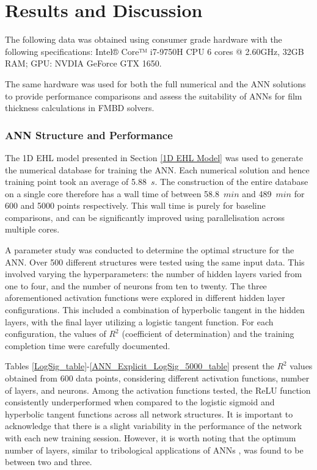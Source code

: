 \section{Results and Discussion}

The following data was obtained using consumer grade hardware with the following specifications: 
Intel® Core™ i7-9750H CPU 6 cores @ 2.60GHz, 32GB RAM; GPU: NVDIA GeForce GTX 1650.

The same hardware was used for both the full numerical and the ANN solutions to provide performance comparisons and assess the suitability of ANNs for film thickness calculations in FMBD solvers.

\subsubsection{ANN Structure and Performance}

The 1D EHL model presented in Section \ref{1D EHL Model} was used to generate the numerical database for training the ANN. Each numerical solution and hence training point took an average of 5.88~$s$. The construction of the entire database on a single core therefore has a wall time of between 58.8~$min$ and 489~$min$ for 600 and 5000 points respectively. This wall time is purely for baseline comparisons, and can be significantly improved using parallelisation across multiple cores.

A parameter study was conducted to determine the optimal structure for the ANN. Over 500 different structures were tested using the same input data. This involved varying the hyperparameters: the number of hidden layers varied from one to four, and the number of neurons from ten to twenty. The three aforementioned activation functions were explored in different hidden layer configurations. This included a combination of hyperbolic tangent in the hidden layers, with the final layer utilizing a logistic tangent function. For each configuration, the values of $R^2$ (coefficient of determination) and the training completion time were carefully documented.

Tables \ref{LogSig_table}-\ref{ANN_Explicit_LogSig_5000_table} present the $R^2$ values obtained from 600 data points, considering different activation functions, number of layers, and neurons. Among the activation functions tested, the ReLU function consistently underperformed when compared to the logistic sigmoid and hyperbolic tangent functions across all network structures. It is important to acknowledge that there is a slight variability in the performance of the network with each new training session. However, it is worth noting that the optimum number of layers, similar to tribological applications of ANNs \cite{Marian2021}, was found to be between two and three.

